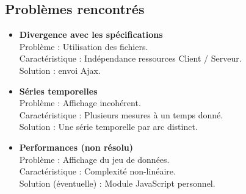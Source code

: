 		\subsection{Problèmes rencontrés}
		\begin{frame}
			\begin{itemize}
			\item \textbf{Divergence avec les spécifications}\\
				\hspace{1em} Problème : Utilisation des fichiers.\\
				\hspace{1em} Caractéristique : Indépendance ressources Client / Serveur.\\
				\hspace{1em} Solution : envoi Ajax.
				
			\item \textbf{Séries temporelles}\\
				\hspace{1em} Problème : Affichage incohérent.\\
				\hspace{1em} Caractéristique : Plusieurs mesures à un temps donné.\\
				\hspace{1em} Solution : Une série temporelle par arc distinct.
				
			\item \textbf{Performances (non résolu)}\\
				\hspace{1em} Problème : Affichage du jeu de données.\\
				\hspace{1em} Caractéristique : Complexité non-linéaire.\\
				\hspace{1em} Solution (éventuelle) : Module JavaScript personnel.
			\end{itemize}
		\end{frame}
	
